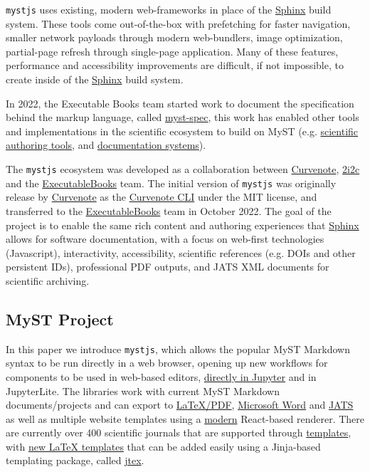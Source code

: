\documentclass{article}
\begin{document}
\texttt{mystjs} uses existing, modern web-frameworks in place of the \href{https://www.sphinx-doc.org/}{Sphinx} build system. These tools come out-of-the-box with prefetching for faster navigation, smaller network payloads through modern web-bundlers, image optimization, partial-page refresh through single-page application. Many of these features, performance and accessibility improvements are difficult, if not impossible, to create inside of the \href{https://www.sphinx-doc.org/}{Sphinx} build system.

In 2022, the Executable Books team started work to document the specification behind the markup language, called \href{https://github.com/executablebooks/myst-spec}{myst-spec}, this work has enabled other tools and implementations in the scientific ecosystem to build on MyST (e.g. \href{https://curvenote.com/for/writing}{scientific authoring tools}, and \href{https://blog.readthedocs.com/jupyter-book-read-the-docs/}{documentation systems}).

The \texttt{mystjs} ecosystem was developed as a collaboration between \href{https://curvenote.com}{Curvenote}, \href{https://2i2c.org/}{2i2c} and the \href{https://executablebooks.org/}{ExecutableBooks} team. The initial version of \texttt{mystjs} was originally release by \href{https://curvenote.com}{Curvenote} as the \href{https://curvenote.com/docs/cli}{Curvenote CLI} under the MIT license, and transferred to the \href{https://executablebooks.org/}{ExecutableBooks} team in October 2022. The goal of the project is to enable the same rich content and authoring experiences that \href{https://www.sphinx-doc.org/}{Sphinx} allows for software documentation, with a focus on web-first technologies (Javascript), interactivity, accessibility, scientific references (e.g. DOIs and other persistent IDs), professional PDF outputs, and JATS XML documents for scientific archiving.

\subsection{MyST Project}\label{MyST Project}

In this paper we introduce \texttt{mystjs}, which allows the popular MyST Markdown syntax to be run directly in a web browser, opening up new workflows for components to be used in web-based editors, \href{https://github.com/executablebooks/jupyterlab-myst}{directly in Jupyter} and in JupyterLite. The libraries work with current MyST Markdown documents/projects and can export to \href{https://myst.tools/docs/mystjs/creating-pdf-documents}{LaTeX/PDF}, \href{https://myst.tools/docs/mystjs/creating-word-documents}{Microsoft Word} and \href{https://myst.tools/docs/mystjs/creating-jats-xml}{JATS} as well as multiple website templates using a \href{https://myst.tools/docs/mystjs/accessibility-and-performance}{modern} React-based renderer. There are currently over 400 scientific journals that are supported through \href{https://github.com/myst-templates}{templates}, with \href{https://myst.tools/docs/jtex/create-a-latex-template}{new LaTeX templates} that can be added easily using a Jinja-based templating package, called \href{https://myst.tools/docs/jtex}{jtex}.
\end{document}
